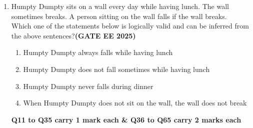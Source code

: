 \documentclass[journal,12pt,onecolumn]{IEEEtran}
\theoremstyle{remark}
\begin{document}
\begin{enumerate}
\item Humpty Dumpty sits on a wall every day while having lunch. The wall sometimes breaks. A person sitting on the wall falls if the wall breaks.  \\
Which one of the statements below is logically valid and can be inferred from the above sentences?\hfill \textbf{(GATE EE 2025)}
\begin{enumerate}
    \item  Humpty Dumpty always falls while having lunch
    \item Humpty Dumpty does not fall sometimes while having lunch
    \item Humpty Dumpty never falls during dinner
    \item  When Humpty Dumpty does not sit on the wall, the wall does not break
\end{enumerate}

\begin{center}
    \textbf{Q11  to Q35 carry 1 mark each \& Q36 to Q65 carry 2 marks each}
\end{center}



\end{enumerate}
\end{document}
